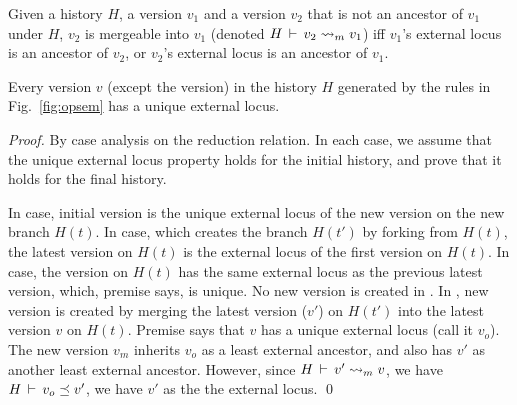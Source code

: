 \begin{definition} 
Given a history $H$, a version $v_1$ and a version $v_2$ that is not
an ancestor of $v_1$ under $H$, $v_2$ is mergeable into $v_1$ (denoted
$H\,\vdash\,v_2 \rightsquigarrow_m v_1$) iff $v_1$'s external locus is an
ancestor of $v_2$, or $v_2$'s external locus is an ancestor of $v_1$.
\end{definition}

\begin{lemma} 
Every version $v$ (except the  version) in the history $H$
generated by the rules in Fig.~\ref{fig:opsem} has a unique external
locus.
\end{lemma}
\begin{proof}
By case analysis on the reduction relation. In each case, we assume
that the unique external locus property holds for the initial history,
and prove that it holds for the final history.

In  case, initial version is the unique external locus of
the new version on the new branch $H(t)$. In  case,
which creates the branch $H(t')$ by forking from $H(t)$, the latest
version on $H(t)$ is the external locus of the first version on
$H(t)$. In  case, the version on $H(t)$ has the same
external locus as the previous latest version, which, premise says, is
unique. No new version is created in . In
, new version is created by merging the latest
version ($v'$) on $H(t')$ into the latest version $v$ on $H(t)$.
Premise says that $v$ has a unique external locus (call it $v_o$). The
new version $v_m$ inherits $v_o$ as a least external ancestor, and
also has $v'$ as another least external ancestor. However, since
$H\,\vdash\,v' \rightsquigarrow_m v$, we have $H\,\vdash\,v_o \preceq v'$, we
have $v'$ as the the external locus.
\qed
\end{proof}


